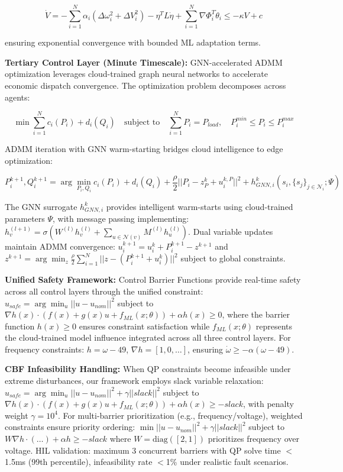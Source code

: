 \documentclass[12pt]{article}
\begin{document}
$$\dot{V} = -\sum_{i=1}^N \alpha_i(\Delta\omega_i^2 + \Delta V_i^2) - \eta^T L \dot{\eta} + \sum_{i=1}^N \nabla\Phi_i^T \dot{\theta}_i \leq -\kappa V + c$$

ensuring exponential convergence with bounded ML adaptation terms.

\textbf{Tertiary Control Layer (Minute Timescale):} GNN-accelerated ADMM optimization leverages cloud-trained graph neural networks to accelerate economic dispatch convergence. The optimization problem decomposes across agents:

$$\min \sum_{i=1}^N c_i(P_i) + d_i(Q_i) \quad \text{subject to} \quad \sum_{i=1}^N P_i = P_{load}, \quad P_i^{min} \leq P_i \leq P_i^{max}$$

ADMM iteration with GNN warm-starting bridges cloud intelligence to edge optimization:

$$P_i^{k+1}, Q_i^{k+1} = \arg\min_{P_i,Q_i} c_i(P_i) + d_i(Q_i) + \frac{\rho}{2}||P_i - z_P^k + u_i^{k,P}||^2 + h_{GNN,i}^k(s_i, \{s_j\}_{j \in \mathcal{N}_i}; \Psi)$$

The GNN surrogate $h_{GNN,i}^k$ provides intelligent warm-starts using cloud-trained parameters $\Psi$, with message passing implementing: $h_v^{(l+1)} = \sigma\left(W^{(l)} h_v^{(l)} + \sum_{u \in \mathcal{N}(v)} M^{(l)} h_u^{(l)}\right)$. Dual variable updates maintain ADMM convergence: $u_i^{k+1} = u_i^k + P_i^{k+1} - z^{k+1}$ and $z^{k+1} = \arg\min_z \frac{\rho}{2}\sum_{i=1}^N ||z - (P_i^{k+1} + u_i^k)||^2$ subject to global constraints.

\textbf{Unified Safety Framework:} Control Barrier Functions \cite{ames2017} provide real-time safety across all control layers through the unified constraint: $u_{safe} = \arg\min_u ||u - u_{nom}||^2$ subject to $\nabla h(x) \cdot (f(x) + g(x)u + f_{ML}(x; \theta)) + \alpha h(x) \geq 0$, where the barrier function $h(x) \geq 0$ ensures constraint satisfaction while $f_{ML}(x; \theta)$ represents the cloud-trained model influence integrated across all three control layers. For frequency constraints: $h = \omega - 49$, $\nabla h = [1,0,\ldots]$, ensuring $\dot{\omega} \geq -\alpha(\omega - 49)$.

\textbf{CBF Infeasibility Handling:} When QP constraints become infeasible under extreme disturbances, our framework employs slack variable relaxation: $u_{safe} = \arg\min_u ||u - u_{nom}||^2 + \gamma||slack||^2$ subject to $\nabla h(x) \cdot (f(x) + g(x)u + f_{ML}(x; \theta)) + \alpha h(x) \geq -slack$, with penalty weight $\gamma = 10^4$. For multi-barrier prioritization (e.g., frequency/voltage), weighted constraints ensure priority ordering: $\min ||u-u_{nom}||^2 + \gamma||slack||^2$ subject to $W\nabla h \cdot (\ldots) + \alpha h \geq -slack$ where $W = \text{diag}([2,1])$ prioritizes frequency over voltage. HIL validation: maximum 3 concurrent barriers with QP solve time $<$1.5ms (99th percentile), infeasibility rate $<$1\% under realistic fault scenarios.
\end{document}
